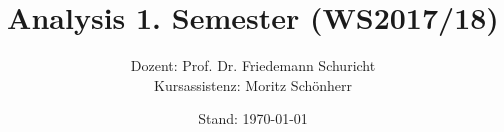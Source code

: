\documentclass[11pt, oneside]{book}
\theoremstyle{break}
\theoremstyle{break}
\begin{document}
\title{\textbf{Analysis 1. Semester (WS2017/18)}}
\author{Dozent: Prof. Dr. Friedemann Schuricht\\
	Kursassistenz: Moritz Schönherr}
\date{Stand: \today}

\frontmatter
\maketitle
\tableofcontents

\mainmatter














\backmatter
\end{document}
